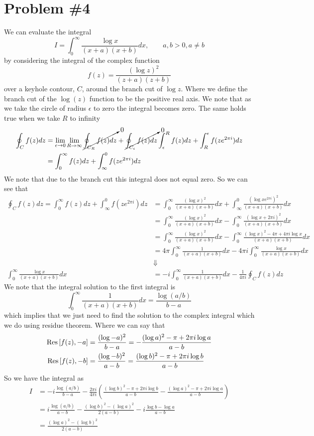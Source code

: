 \documentclass[11pt]{article}
\numberwithin{equation}{section}
\begin{document}
\section{Problem \#4}
We can evaluate the integral 
$$I = \int_{0}^{\infty}\frac{\log{x}}{(x+a)(x+b)}dx,\qquad a,b>0,a\ne{b}$$
by considering the integral of the complex function
$$f(z) = \frac{(\log{z})^2}{(z+a)(z+b)}$$
over a keyhole contour, $C$, around the branch cut of $\log{z}$. Where we define the branch cut of
the $\log(z)$ function to be the positive real axis. We note that as we take the circle of 
radius $\epsilon$ to zero the integral becomes zero. The same holds true when we take $R$ to
infinity
\begin{align*}
\oint_{C}f(z)dz &= \lim_{\epsilon\rightarrow{0}}\lim_{R\rightarrow\infty}\cancelto{0}{\oint_{C_{R}}f(z)dz} + \cancelto{0}{\oint_{C_{\epsilon}}f(z)dz} \int_{\epsilon}^{R}f(z)dz + \int^{\epsilon}_{R}f(ze^{2\pi{i}})dz\\
&= \int_{0}^{\infty}f(z)dz + \int_{\infty}^{0}f(ze^{2\pi{i}})dz
\end{align*}
We note that due to the branch cut this integral does not equal zero. So we can see that
\begin{align*}
\oint_{C}f(z)dz = \int_{0}^{\infty}f(z)dz + \int_{\infty}^{0}f(ze^{2\pi{i}})dz &= \int_{0}^{\infty}\frac{(\log{x})^2}{(x+a)(x+b)}dx + \int_{\infty}^{0}\frac{(\log{xe^{2\pi{i}}})^2}{(x+a)(x+b)}dx\\
&= \int_{0}^{\infty}\frac{(\log{x})^2}{(x+a)(x+b)}dx - \int^{\infty}_{0}\frac{(\log{x}+2\pi{i})^2}{(x+a)(x+b)}dx\\
&= \int_{0}^{\infty}\frac{(\log{x})^2}{(x+a)(x+b)}dx - \int^{\infty}_{0}\frac{(\log{x})^2-4\pi+4\pi{i}\log{x}}{(x+a)(x+b)}dx\\
&= 4\pi\int_{0}^{\infty}\frac{1}{(x+a)(x+b)}dx - 4\pi{i}\int^{\infty}_{0}\frac{\log{x}}{(x+a)(x+b)}dx\\
&\Downarrow\\
\int^{\infty}_{0}\frac{\log{x}}{(x+a)(x+b)}dx &= -i\int_{0}^{\infty}\frac{1}{(x+a)(x+b)}dx - \frac{1}{4\pi{i}}\oint_{C}f(z)dz
\end{align*}
We note that the integral solution to the first integral is
$$\int_{0}^{\infty}\frac{1}{(x+a)(x+b)}dx = \frac{\log{(a/b)}}{b-a}$$
which implies that we just need to find the solution to the complex integral which we do using
residue theorem. Where we can say that
\begin{align*}
\textnormal{Res}\left[{f(z)},{-a}\right] &= \frac{(\log{-a})^2}{b-a} = -\frac{(\log{a})^2-\pi+2\pi i\log{a}}{a-b}\\
\textnormal{Res}\left[{f(z)},{-b}\right] &= \frac{(\log{-b})^2}{a-b} = \frac{(\log{b})^2-\pi+2\pi{i}\log{b}}{a-b}
\end{align*}
So we have the integral as
\begin{align*}
I &= -i\frac{\log{(a/b)}}{b-a} - \frac{2\pi{i}}{4\pi{i}}\left(\frac{(\log{b})^2-\pi+2\pi{i}\log{b}}{a-b} - \frac{(\log{a})^2-\pi+2\pi i\log{a}}{a-b}\right)\\
&= i\frac{\log{(a/b)}}{a-b} - \frac{(\log{b})^2-(\log{a})^2}{2(a-b)} - {i}\frac{\log{b}-\log{a}}{a-b}\\
&= \frac{(\log{a})^2-(\log{b})^2}{2(a-b)} 
\end{align*}
\end{document}
